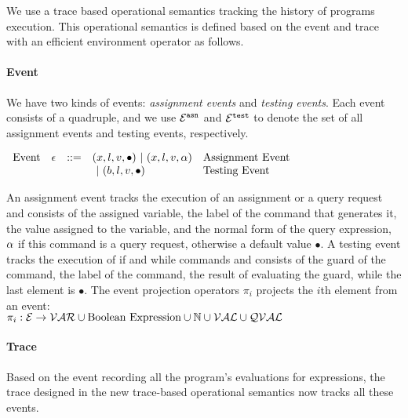 

We use a trace based operational semantics tracking the history of programs execution.
This operational semantics is defined based on the event and trace with an efficient 
environment operator as follows.


\paragraph{Event}
We have two kinds of events: \emph{assignment events} and \emph{testing events}. 
Each event consists of a quadruple,
and we use $\mathcal{E}^{\mathtt{{asn}}}$ and $\mathcal{E}^{\mathtt{{test}}}$ to denote the set of all assignment events and testing events, respectively.
\begin{center}
$ \begin{array}{lllll}
\mbox{Event} 
& \mathtt{\epsilon} & ::= & 
({x}, l, v, \bullet) ~|~ ({x}, l, v, \alpha)  & \mbox{Assignment Event} \\
&&& ~|~(b, l, v, \bullet)  & \mbox{Testing Event}
\\
\end{array}$
\end{center}
An assignment event tracks the execution of an assignment  or a query request and consists of the assigned variable, the label of the command that generates it, the value assigned to the variable, and the normal form of the query expression, $\alpha$ if this command is a query request, otherwise a default value $\bullet$.
A testing event tracks the execution of if and while commands and consists of the guard of the command, the label of the command, the result of evaluating the guard, while the last element is $\bullet$.
%
The event projection operators $\pi_i$ projects the $i$th element from an event: 
\\
$\pi_i : 
\mathcal{E} \to \mathcal{VAR}\cup \mbox{Boolean Expression}  \cup \mathbb{N} \cup \mathcal{VAL} \cup \mathcal{QVAL} $ 
\\
%
\paragraph{Trace}
  Based on the event recording all the program's evaluations for expressions, 
 the trace designed in the new trace-based operational semantics
 now tracks all these events.

